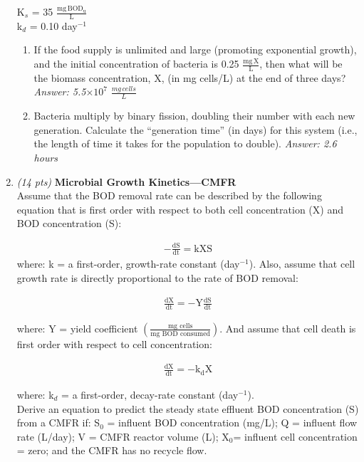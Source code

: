 \documentclass[12pt,letterpaper]{article}
\begin{document}
\begin{enumerate}
K$_s$ = 35 $\mathrm{\frac{mg \, BOD_u}{L}}$\\

k$_d$ = 0.10 day$^{-1}$
 
\begin{enumerate}
\item If the food supply is unlimited and large (promoting exponential growth), and the initial concentration of bacteria is 0.25 $\mathrm{\frac{mg \,X}{L}}$, then what will be the biomass concentration, X, (in mg cells/L) at the end of three days? \emph{Answer: 5.5$\times 10^7\,\, \frac{mg\, cells}{L}$}
 
\item Bacteria multiply by binary fission, doubling their number with each new generation. Calculate the ``generation time'' (in days) for this system (i.e., the length of time it takes for the population to double). \emph{Answer: 2.6 hours}

\end{enumerate}

\item \emph{(14 pts)} \textbf{Microbial Growth Kinetics---CMFR}\\
Assume that the BOD removal rate can be described by the following equation that is first order with respect to both cell concentration (X) and BOD concentration (S):

\begin{align}
\mathrm{-\frac{dS}{dt} = kXS}
\end{align}
where: k = a first-order, growth-rate constant (day$^{-1}$). Also, assume that cell growth rate is directly proportional to the rate of BOD removal: 

\begin{align}
\mathrm{\frac{dX}{dt} = -Y\frac{dS}{dt}}
\end{align}

where: Y = yield coefficient $\mathrm{\left(\frac{mg \,\, cells}{mg \, \, BOD \, \, consumed}\right)}$. And assume that cell death is first order with respect to cell concentration: 


\begin{align}
\mathrm{\frac{dX}{dt} = -k_dX}
\end{align}


where: k$_d$ = a first-order, decay-rate constant (day$^{-1}$).\\

Derive an equation to predict the steady state effluent BOD concentration (S) from a CMFR if: S$_0$ = influent BOD concentration (mg/L); Q = influent flow rate (L/day);
V = CMFR reactor volume (L); X$_0$= influent cell concentration = zero; and the CMFR has no recycle flow.


\end{enumerate}
\end{document}
